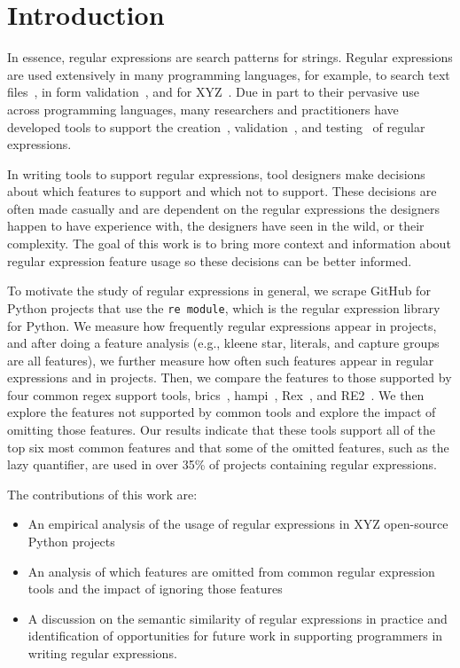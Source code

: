 \section{Introduction}

 In essence, regular expressions are search patterns for strings. Regular expressions are used extensively in many programming languages, for example, to search text files~\cite{Clarke:1997:URE:256167.256174}, in form validation~\cite{}, and for XYZ~\cite{}. Due in part to their pervasive use across programming languages, many researchers and practitioners have developed tools to support the creation~\cite{}, validation~\cite{}, and testing~\cite{} of regular expressions.

 In writing tools to support regular expressions, tool designers make decisions about which features to support and which not to support. These decisions are often made casually and are dependent on the regular expressions the designers happen to have experience with, the designers have seen in the wild, or their complexity. The goal of this work is to bring more context and information about regular expression feature usage so these decisions can be better informed.

To motivate the study of regular expressions in general, we scrape GitHub for Python projects that use the {\tt re module}, which is the regular expression library for Python. We measure how frequently regular expressions appear in projects, and after doing a feature analysis (e.g., kleene star, literals, and capture groups are all features), we further measure how often such features appear in regular expressions and in projects. Then, we compare the features to those supported by four common regex support tools, brics~\cite{}, hampi~\cite{}, Rex~\cite{}, and RE2~\cite{}. We then explore the features not supported by common tools and explore the impact of omitting those features. Our results indicate that these tools support all of the top six most common features and that some of the omitted features, such as the lazy quantifier, are used in over 35\% of projects containing regular expressions.

The contributions of this work are:

\begin{itemize}
	\item An empirical analysis of the usage of regular expressions in XYZ open-source Python projects
	\item An analysis of which features are omitted from common regular expression tools and the impact of ignoring those features
	\item A discussion on the semantic similarity of regular expressions in practice and identification of opportunities for future work in supporting programmers in writing regular expressions.
\end{itemize}

